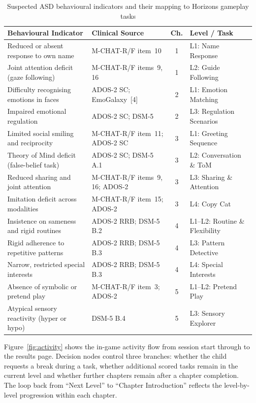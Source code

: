 \documentclass[12pt,a4paper,oneside]{report}
\begin{document}
	\begin{table}[H]
		\caption{Suspected ASD behavioural indicators and their mapping to Horizons gameplay tasks}
		\label{tab:behaviors}
		\begin{tabularx}{\linewidth}{Xp{3.2cm}cp{2.8cm}}
			\toprule
			\textbf{Behavioural Indicator} & \textbf{Clinical Source} & \textbf{Ch.} & \textbf{Level / Task} \\
			\midrule
			Reduced or absent response to own name
			& M-CHAT-R/F item~10 & 1 & L1: Name Response \\
			Joint attention deficit (gaze following)
			& M-CHAT-R/F items~9, 16 & 1 & L2: Guide Following \\
			Difficulty recognising emotions in faces
			& ADOS-2 SC; EmoGalaxy~[4] & 2 & L1: Emotion Matching \\
			Impaired emotional regulation
			& ADOS-2 SC; DSM-5 & 2 & L3: Regulation Scenarios \\
			Limited social smiling and reciprocity
			& M-CHAT-R/F item~11; ADOS-2 SC & 3 & L1: Greeting Sequence \\
			Theory of Mind deficit (false-belief task)
			& ADOS-2 SC; DSM-5 A.1 & 3 & L2: Conversation \& ToM \\
			Reduced sharing and joint attention
			& M-CHAT-R/F items~9, 16; ADOS-2 & 3 & L3: Sharing \& Attention \\
			Imitation deficit across modalities
			& M-CHAT-R/F item~15; ADOS-2 & 3 & L4: Copy Cat \\
			Insistence on sameness and rigid routines
			& ADOS-2 RRB; DSM-5 B.2 & 4 & L1--L2: Routine \& Flexibility \\
			Rigid adherence to repetitive patterns
			& ADOS-2 RRB; DSM-5 B.3 & 4 & L3: Pattern Detective \\
			Narrow, restricted special interests
			& ADOS-2 RRB; DSM-5 B.3 & 4 & L4: Special Interests \\
			Absence of symbolic or pretend play
			& M-CHAT-R/F item~3; ADOS-2 & 5 & L1--L2: Pretend Play \\
			Atypical sensory reactivity (hyper or hypo)
			& DSM-5 B.4 & 5 & L3: Sensory Explorer \\
			\bottomrule
		\end{tabularx}
	\end{table}
	
	
	
	Figure~\ref{fig:activity} shows the in-game activity flow from session start through to the results page. Decision nodes control three branches: whether the child requests a break during a task, whether additional scored tasks remain in the current level and whether further chapters remain after a chapter completion. The loop back from ``Next Level'' to ``Chapter Introduction'' reflects the level-by-level progression within each chapter.
	
\end{document}
